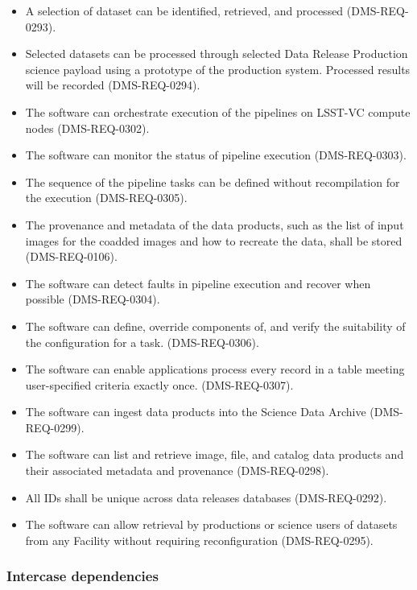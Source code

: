 \begin{itemize}

  \item{A selection of dataset can be identified, retrieved, and processed (DMS-REQ-0293).}
  \item{Selected datasets can be processed through selected Data Release Production science payload using a prototype of the production system. Processed results will be recorded (DMS-REQ-0294).}
  \item{The software can orchestrate execution of the pipelines on LSST-VC compute nodes (DMS-REQ-0302).}
  \item{The software can monitor the status of pipeline execution (DMS-REQ-0303).}
  \item{The sequence of the pipeline tasks can be defined without recompilation for the execution (DMS-REQ-0305).}

  \item{The provenance and metadata of the data products, such as the list of input images for the coadded images and how to recreate the data, shall be stored (DMS-REQ-0106).}
  \item{The software can detect faults in pipeline execution and recover when possible (DMS-REQ-0304).}
  \item{The software can define, override components of, and verify the suitability of the configuration for a task. (DMS-REQ-0306).}
  \item{The software can enable applications process every record in a table meeting
user-specified criteria exactly once. (DMS-REQ-0307).}
  \item{The software can ingest data products into the Science Data Archive (DMS-REQ-0299).}
  \item{The software can list and retrieve image, file, and catalog data products and their associated metadata and provenance (DMS-REQ-0298).}
  \item{All IDs shall be unique across data releases databases (DMS-REQ-0292).}
  \item{The software can allow retrieval by productions or science users of datasets from any Facility without requiring reconfiguration (DMS-REQ-0295).}

\end{itemize}

\subsubsection{Intercase dependencies}

